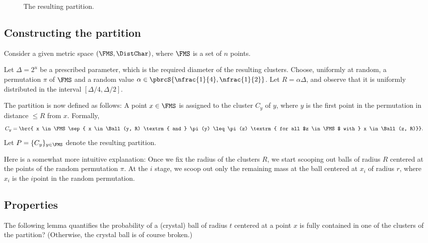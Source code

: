 \begin{figure}[t]
    \centerline{%
    }%
    \caption{The resulting partition.}
\end{figure}


\subsection{Constructing the partition}

Consider a given metric space $(\FMS, \DistChar)$, where $\FMS$ is a
set of $n$ points.

Let $\Delta = 2^u$ be a prescribed parameter, which is the required
diameter of the resulting clusters.  Choose, uniformly at random, a
permutation $\pi$ of $\FMS$ and a random value $\alpha \in
\pbrcS{\nfrac{1}{4},\nfrac{1}{2}}$. Let $R = \alpha \Delta$, and
observe that it is uniformly distributed in the interval $[\Delta/4,
\Delta/2]$.

The partition is now defined as follows: A point $x\in \FMS$ is assigned
to the cluster $C_y$ of $y$, where $y$ is the first point in the
permutation in distance $\leq R$ from $x$. Formally,
\begin{equation*}
C_y = \brc{ x \in \FMS \sep{ x \in \Ball(y, R) \textrm { and } \pi(y)
      \leq \pi(z) \textrm{ for all $z \in \FMS$ with } x \in \Ball(z,
      R)}}.
\end{equation*}
Let $P = \{C_y\}_{y \in \FMS}$ denote the resulting partition.

Here is a somewhat more intuitive explanation: Once we fix the radius
of the clusters $R$, we start scooping out balls of radius $R$
centered at the points of the random permutation $\pi$. At the $i$\th
stage, we scoop out only the remaining mass at the ball centered at
$x_i$ of radius $r$, where $x_i$ is the $i$\th point in the random
permutation.


\subsection{Properties}

The following lemma quantifies the probability of a (crystal) ball of
radius $t$ centered at a point $x$ is fully contained in one of the
clusters of the partition? (Otherwise, the crystal ball is of course
broken.)

